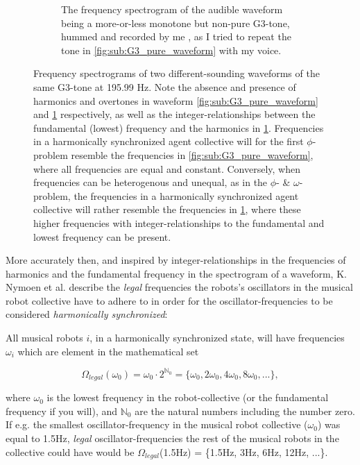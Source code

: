 \begin{figure}[ht!]
\begin{subfigure}[t]{.5\textwidth}
					\caption{The frequency spectrogram of the audible waveform being a more-or-less monotone but non-pure G3-tone, hummed and recorded by me \cite{}, as I tried to repeat the tone in \ref{fig:sub:G3_pure_waveform} with my voice.}
					\label{fig:sub:G3_hummed_waveform}
				\end{subfigure}
			\caption[Frequency spectrograms illustrating the absence and presence of harmonics and overtones in audible waveforms]{Frequency spectrograms of two different-sounding waveforms of the same G3-tone at 195.99 Hz. Note the absence and presence of harmonics and overtones in waveform \ref{fig:sub:G3_pure_waveform} and \ref{fig:sub:G3_hummed_waveform} respectively, as well as the integer-relationships between the fundamental (lowest) frequency and the harmonics in \ref{fig:sub:G3_hummed_waveform}. Frequencies in a harmonically synchronized agent collective will for the first $\phi$-problem resemble the frequencies in \ref{fig:sub:G3_pure_waveform}, where all frequencies are equal and constant. Conversely, when frequencies can be heterogenous and unequal, as in the $\phi$- \& $\omega$-problem, the frequencies in a harmonically synchronized agent collective will rather resemble the frequencies in \ref{fig:sub:G3_hummed_waveform}, where these higher frequencies with integer-relationships to the fundamental and lowest frequency can be present.}
			\label{fig:frequency_spectrograms}
		\end{figure}

		More accurately then, and inspired by integer-relationships in the frequencies of harmonics and the fundamental frequency in the spectrogram of a waveform, K. Nymoen et al. \cite{nymoen_synch} describe the \textit{legal} frequencies the robots's oscillators in the musical robot collective have to adhere to in order for the oscillator-frequencies to be considered \textit{harmonically synchronized}:

		All musical robots $i$, in a harmonically synchronized state, will have frequencies $\omega_i$ which are element in the mathematical set

		\begin{equation}\label{legal_freqs}
		\Omega_{legal}(\omega_0) = \omega_{0} \cdot 2^{\mathbb{N}_0} = \{\omega_{0}, 2\omega_{0}, 4\omega_{0}, 8\omega_{0}, ...\} ,
		\end{equation}

		where $\omega_{0}$ is the lowest frequency in the robot-collective (or the fundamental frequency if you will), and $\mathbb{N}_0$ are the natural numbers including the number zero. If e.g. the smallest oscillator-frequency in the musical robot collective ($\omega_0$) was equal to 1.5Hz, \textit{legal} oscillator-frequencies the rest of the musical robots in the collective could have would be $\Omega_{legal}$(1.5Hz) = \{1.5Hz, 3Hz, 6Hz, 12Hz, ...\}.

